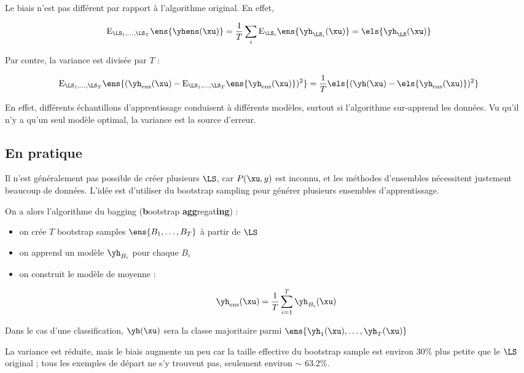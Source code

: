 	Le biais n'est pas différent par rapport à l'algorithme original. En effet,
	
	$$\text{E}_{\LS_1, \dots , \LS_T} \ens{\yhens (\xu)} = \frac{1}{T} \sum_i \text{E}_{\LS_i}\ens{\yh_{\LS_i}(\xu)} = \els{\yh_{\LS}(\xu)}$$
	
	Par contre, la variance est divisée par $T$ :
	
	$$\text{E}_{\LS_1, \dots , \LS_T} \ens{(\yh_{\text{ens}}(\xu) - \text{E}_{\LS_1, \dots , \LS_T} \ens{\yh_{\text{ens}}(\xu)})^2} = \frac{1}{T} \els{(\yh(\xu) - \els{\yh_{\text{ens}}(\xu)})^2}$$
	
	En effet, différents échantillons d'apprentissage conduisent à différents modèles, surtout si l'algorithme sur-apprend les données. Vu qu'il n'y a qu'un seul modèle optimal, la variance est la source d'erreur.
	
	
	\subsection{En pratique}
	
	Il n'est généralement pas possible de créer plusieurs $\LS$, car $P(\xu, y)$ est inconnu, et les méthodes d'ensembles nécessitent justement beaucoup de données. L'idée est d'utiliser du bootstrap sampling pour générer plusieurs ensembles d'apprentissage.

	
	On a alors l'algorithme du bagging (\textbf{b}ootstrap \textbf{agg}regat\textbf{ing}) :
	
	\begin{itemize}
		\item on crée $T$ bootstrap samples $\ens{B_1, \dots , B_T}$ à partir de $\LS$
		\item on apprend un modèle $\yh_{B_i}$ pour chaque $B_i$
		\item on construit le modèle de moyenne :
		
		$$\yh_{\text{ens}}(\xu) = \frac{1}{T} \sum_{i = 1}^T \yh_{B_i}(\xu)$$
	\end{itemize}
	
	
	Dans le cas d'une classification, $\yh(\xu)$ sera la classe majoritaire parmi $\ens{\yh_1(\xu), \dots , \yh_T(\xu)}$

	
	La variance est réduite, mais le biais augmente un peu car la taille effective du bootstrap sample est environ 30\% plus petite que le $\LS$ original ; tous les exemples de départ ne s'y trouvent pas, seulement environ $\sim$ 63.2\%.
	
